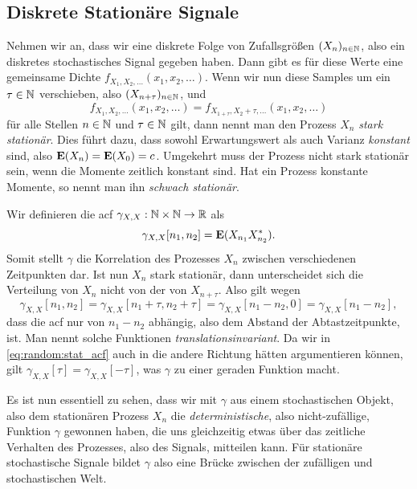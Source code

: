 \subsection{Diskrete Stationäre Signale}\label{sec:random:station}

Nehmen wir an, dass wir eine diskrete Folge von Zufallsgrößen $(X_{n})_{n \in \mathbb{N}}$, also ein diskretes stochastisches Signal gegeben haben.
Dann gibt es für diese Werte eine gemeinsame Dichte $f_{X_{1}, X_{2}, \ldots}(x_1, x_2, \ldots)$.
Wenn wir nun diese Samples um ein $\tau \in \mathbb{N}$ verschieben, also $(X_{n + \tau})_{n \in \mathbb{N}}$, und 
%
\[
f_{X_{1}, X_{2}, \ldots}(x_1, x_2, \ldots) =
    f_{X_{1 + \tau}, X_{2} + \tau, \ldots}(x_1, x_2, \ldots)
\]
%
für alle Stellen $n \in \mathbb{N}$ und $\tau \in \mathbb{N}$ gilt, dann nennt man den Prozess $X_n$ \emph{stark stationär}.
Dies führt dazu, dass sowohl Erwartungswert als auch Varianz \emph{konstant} sind, also $\bm{\mathrm{E}}(X_n) = \bm{\mathrm{E}}(X_0) = c$.
Umgekehrt muss der Prozess nicht stark stationär sein, wenn die Momente zeitlich konstant sind.
Hat ein Prozess konstante Momente, so nennt man ihn \emph{schwach stationär}.

Wir definieren die \gls{acf} $\gamma_{X,X}: \mathbb{N} \times \mathbb{N} \rightarrow \mathbb{R}$ als
\begin{equation}
    \label{eq:random:acf}
    \gamma_{X,X}[n_1, n_2] = \bm{\mathrm{E}}(X_{n_1} X^\ast_{n_2}).
\end{equation}
Somit stellt $\gamma$ die Korrelation des Prozesses $X_n$ zwischen verschiedenen Zeitpunkten dar.
Ist nun $X_n$ stark stationär, dann unterscheidet sich die Verteilung von $X_n$ nicht von der von $X_{n + \tau}$.
Also gilt wegen
\begin{equation}
    \label{eq:random:stat_acf}
    \gamma_{X,X}[n_1, n_2] 
        = \gamma_{X,X}[n_1 + \tau, n_2 + \tau]
        = \gamma_{X,X}[n_1 - n_2, 0] = \gamma_{X,X}[n_1 - n_2],
\end{equation}
dass die \gls{acf} nur von $n_1-n_2$ abhängig, also dem Abstand der Abtastzeitpunkte, ist.
Man nennt solche Funktionen \emph{translationsinvariant}.
Da wir in \eqref{eq:random:stat_acf} auch in die andere Richtung hätten argumentieren können, gilt $\gamma_{X,X}[\tau] = \gamma_{X,X}[-\tau]$, was $\gamma$ zu einer geraden Funktion macht.

Es ist nun essentiell zu sehen, dass wir mit $\gamma$ aus einem stochastischen Objekt, also dem stationären Prozess $X_n$ die \emph{deterministische}, also nicht-zufällige, Funktion $\gamma$ gewonnen haben, die uns gleichzeitig etwas über das zeitliche Verhalten des Prozesses, also des Signals, mitteilen kann.
Für stationäre stochastische Signale bildet $\gamma$ also eine Brücke zwischen der zufälligen und stochastischen Welt.

